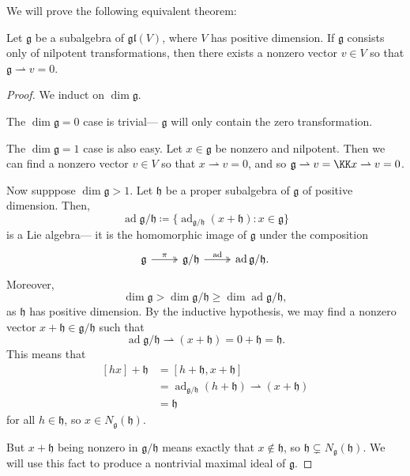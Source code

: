 \documentclass{article}
\newcommand{\lb}[1]{\ensuremath{\left[{#1}\right]}}
\DeclareMathOperator{\ad}{ad}
\newcommand{\frkg}{{\ensuremath{\mathfrak{g}}}}
\newcommand{\frkh}{{\ensuremath{\mathfrak{h}}}}
\newcommand{\glalg}{\ensuremath{\mathfrak{gl}}}
\begin{document}
We will prove the following equivalent theorem:

\begin{theorem}
    Let $\frkg$ be a subalgebra of $\glalg(V)$, where $V$ has positive dimension.
    If $\frkg$ consists only of nilpotent transformations, then there exists a nonzero vector $v \in V$ so that $\frkg \rightharpoonup v = 0$.
\end{theorem}

\begin{proof}
    We induct on $\dim \frkg$.

    The $\dim \frkg = 0$ case is trivial--- $\frkg$ will only contain the zero transformation.

    The $\dim \frkg = 1$ case is also easy.
    Let $x \in \frkg$ be nonzero and nilpotent.
    Then  we can find a nonzero vector $v \in V$ so that $x \rightharpoonup v = 0$, and so $\frkg \rightharpoonup v = \KK x \rightharpoonup v = 0$.

    Now supppose $\dim \frkg > 1$.
    Let $\frkh$ be a proper subalgebra of $\frkg$ of positive dimension.
    Then,
    \[
        \ad \frkg/\frkh
        \coloneq
        \Big\{
            \ad_{\frkg/\frkh}(x + \frkh)
            :
            x \in \frkg
        \Big\}
    \]
    is a Lie algebra--- it is the homomorphic image of $\frkg$ under the composition
    \[
        \begin{tikzcd}
            \frkg \arrow[r, "\pi", two heads] & \frkg/\frkh \arrow[r, "\ad", two heads] & \ad \frkg/\frkh. 
        \end{tikzcd}
    \]
    Moreover, 
    \[
        \dim \frkg > \dim \frkg/\frkh \geq \dim \ad \frkg/\frkh,
    \]
    as $\frkh$ has positive dimension.
    By the inductive hypothesis, we may find a nonzero vector $x + \frkh \in \frkg/\frkh$ such that
    \[
        \ad \frkg/\frkh \rightharpoonup (x + \frkh) 
        = 
        0 + \frkh = \frkh.
    \]
    This means that
    \begin{align*}
        \lb{hx} + \frkh
        &=
        \lb{h + \frkh, x + \frkh}
        \\
        &=
        \ad_{\frkg/\frkh} (h + \frkh) \rightharpoonup (x + \frkh) 
        \\
        &= 
        \frkh
    \end{align*}
    for all $h \in \frkh$, so $x \in N_\frkg(\frkh)$.

    But $x + \frkh$ being nonzero in $\frkg/\frkh$ means exactly that $x \notin \frkh$, so $\frkh \subsetneq N_\frkg(\frkh)$.
    We will use this fact to produce a nontrivial maximal ideal of $\frkg$.


\end{proof}
\end{document}
